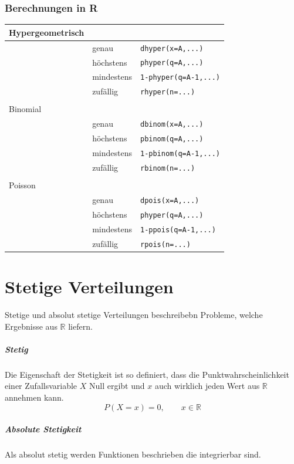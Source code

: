 \subsection{Berechnungen in R}

\begin{table}[h!]
	\begin{tabular}{l l l}
	Hypergeometrisch & & \\ \hline
		& genau 	& \verb!dhyper(x=A,...)! \\
		& höchstens 	& \verb!phyper(q=A,...)! \\
		& mindestens 	& \verb!1-phyper(q=A-1,...)! \\
		& zufällig 	& \verb!rhyper(n=...)! \\
	& & \\
	Binomial & & \\ \hline
		& genau 	& \verb!dbinom(x=A,...)! \\
		& höchstens 	& \verb!pbinom(q=A,...)! \\
		& mindestens 	& \verb!1-pbinom(q=A-1,...)! \\
		& zufällig 	& \verb!rbinom(n=...)! \\
	& & \\
	Poisson & & \\ \hline
		& genau 	& \verb!dpois(x=A,...)! \\
		& höchstens 	& \verb!phyper(q=A,...)! \\
		& mindestens 	& \verb!1-ppois(q=A-1,...)! \\
		& zufällig 	& \verb!rpois(n=...)! \\
	\end{tabular}
\end{table}

\chapter{Stetige Verteilungen}
Stetige und absolut stetige Verteilungen beschreibebn Probleme, 
welche Ergebnisse aus $\mathbb{R}$ liefern.

\paragraph{Stetig} Die Eigenschaft der Stetigkeit ist so definiert,
dass die Punktwahrscheinlichkeit einer Zufallsvariable 
$X$ Null ergibt und $x$ auch wirklich jeden Wert aus
$\mathbb{R}$ annehmen kann.
\[ 
	P(X=x) = 0, \qquad x\in\mathbb{R}
\]
\paragraph{Absolute Stetigkeit}
Als absolut stetig werden Funktionen beschrieben die integrierbar 
sind. 

